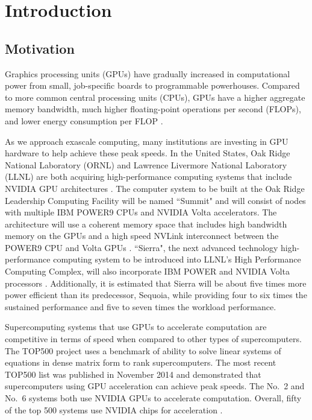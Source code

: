 \chapter{Introduction}

\section{Motivation}

Graphics processing units (GPUs) have gradually increased in computational power from small, 
job-specific boards to programmable powerhouses. Compared to more common central processing units (CPUs), 
GPUs have a higher aggregate memory bandwidth, much higher floating-point operations per second 
(FLOPs), and lower energy consumption per FLOP \cite{warp2015}.

As we approach exascale computing, many institutions are investing in GPU hardware to help achieve these
peak speeds. In the United States, Oak Ridge National Laboratory (ORNL) and Lawrence Livermore National
Laboratory (LLNL) are both acquiring high-performance computing systems that include NVIDIA GPU 
architectures \cite{ornl, llnl}. The computer system to be built at the Oak Ridge Leadership Computing
Facility will be named ``Summit" and will consist of nodes with multiple IBM POWER9 CPUs and NVIDIA Volta
accelerators. The architecture will use a coherent memory space that includes high bandwidth memory on the
GPUs and a high speed NVLink interconnect between the POWER9 CPU and Volta GPUs \cite{ornl}. ``Sierra",
the next advanced technology high-performance computing system to be introduced into LLNL's High
Performance Computing Complex, will also incorporate IBM POWER and NVIDIA Volta processors \cite{llnl}.
Additionally, it is estimated that Sierra will be about five times more power efficient than its
predecessor, Sequoia, while providing four to six times the sustained performance and five to seven times
the workload performance.

Supercomputing systems that use GPUs to accelerate computation are competitive in terms of speed when 
compared to other types of supercomputers. The TOP500 project uses a benchmark of ability to solve
linear systems of equations in dense matrix form to rank supercomputers. The most recent TOP500 list was
published in November 2014 \cite{top500} and demonstrated that supercomputers using GPU acceleration can
achieve peak speeds. The No.\ 2 and No.\ 6 systems both use NVIDIA GPUs to accelerate computation. 
Overall, fifty of the top 500 systems use NVIDIA chips for acceleration \cite{top500}.

